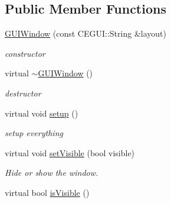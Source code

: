 \subsection*{Public Member Functions}
\begin{DoxyCompactItemize}
\item 
\hyperlink{class_n_c_t_u_1_1_g_u_i_window_a17117dcf2c77d559f55667e141f7ca15}{G\+U\+I\+Window} (const C\+E\+G\+U\+I\+::\+String \&layout)\hypertarget{class_n_c_t_u_1_1_g_u_i_window_a17117dcf2c77d559f55667e141f7ca15}{}\label{class_n_c_t_u_1_1_g_u_i_window_a17117dcf2c77d559f55667e141f7ca15}

\begin{DoxyCompactList}\small\item\em constructor \end{DoxyCompactList}\item 
virtual \hyperlink{class_n_c_t_u_1_1_g_u_i_window_a9c6d4277ffc74763b0a19fcdf15a5b7c}{$\sim$\+G\+U\+I\+Window} ()\hypertarget{class_n_c_t_u_1_1_g_u_i_window_a9c6d4277ffc74763b0a19fcdf15a5b7c}{}\label{class_n_c_t_u_1_1_g_u_i_window_a9c6d4277ffc74763b0a19fcdf15a5b7c}

\begin{DoxyCompactList}\small\item\em destructor \end{DoxyCompactList}\item 
virtual void \hyperlink{class_n_c_t_u_1_1_g_u_i_window_acbb70d27b61444db31c8e27cab84f1fa}{setup} ()\hypertarget{class_n_c_t_u_1_1_g_u_i_window_acbb70d27b61444db31c8e27cab84f1fa}{}\label{class_n_c_t_u_1_1_g_u_i_window_acbb70d27b61444db31c8e27cab84f1fa}

\begin{DoxyCompactList}\small\item\em setup everything \end{DoxyCompactList}\item 
virtual void \hyperlink{class_n_c_t_u_1_1_g_u_i_window_a2b43d1bd60453002b592dd509b0eb2da}{set\+Visible} (bool visible)\hypertarget{class_n_c_t_u_1_1_g_u_i_window_a2b43d1bd60453002b592dd509b0eb2da}{}\label{class_n_c_t_u_1_1_g_u_i_window_a2b43d1bd60453002b592dd509b0eb2da}

\begin{DoxyCompactList}\small\item\em Hide or show the window. \end{DoxyCompactList}\item 
virtual bool \hyperlink{class_n_c_t_u_1_1_g_u_i_window_a657b0f27eddefc6925f0f8bb5e2fa662}{is\+Visible} ()\hypertarget{class_n_c_t_u_1_1_g_u_i_window_a657b0f27eddefc6925f0f8bb5e2fa662}{}\label{class_n_c_t_u_1_1_g_u_i_window_a657b0f27eddefc6925f0f8bb5e2fa662}


\end{DoxyCompactItemize}

